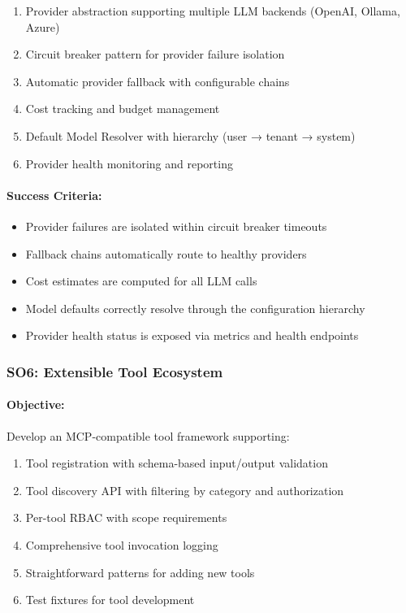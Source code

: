 \documentclass[a4paper,twoside]{sapthesis}
\begin{document}
\begin{enumerate}
    \item Provider abstraction supporting multiple LLM backends (OpenAI, Ollama, Azure)
    \item Circuit breaker pattern for provider failure isolation
    \item Automatic provider fallback with configurable chains
    \item Cost tracking and budget management
    \item Default Model Resolver with hierarchy (user → tenant → system)
    \item Provider health monitoring and reporting
\end{enumerate}

\paragraph{Success Criteria:}
\begin{itemize}
    \item Provider failures are isolated within circuit breaker timeouts
    \item Fallback chains automatically route to healthy providers
    \item Cost estimates are computed for all LLM calls
    \item Model defaults correctly resolve through the configuration hierarchy
    \item Provider health status is exposed via metrics and health endpoints
\end{itemize}

\subsubsection{SO6: Extensible Tool Ecosystem}

\paragraph{Objective:} Develop an MCP-compatible tool framework supporting:

\begin{enumerate}
    \item Tool registration with schema-based input/output validation
    \item Tool discovery API with filtering by category and authorization
    \item Per-tool RBAC with scope requirements
    \item Comprehensive tool invocation logging
    \item Straightforward patterns for adding new tools
    \item Test fixtures for tool development
\end{enumerate}
\end{document}
